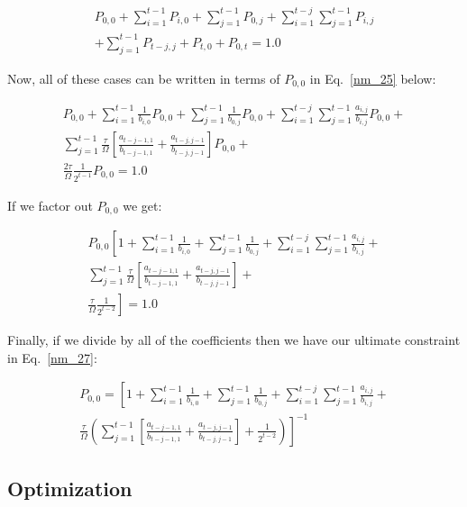 \documentclass[conference]{IEEEtran}
\begin{document}
\begin{multline}
  P_{0,0} +  \sum_{i = 1}^{t-1}{P_{i,0}} + \sum_{j = 1}^{t-1}{P_{0,j}} + \sum_{i=1}^{t-j}{\sum_{j=1}^{t-1}{P_{i,j}}} \\
  + \sum_{j=1}^{t-1}{P_{t-j,j}} + P_{t, 0} + P_{0, t} = 1.0 \label{nm_24}
\end{multline}

Now, all of these cases can be written in terms of $P_{0,0}$ in Eq.~\ref{nm_25} below:

\begin{multline}
  P_{0,0} +  \sum_{i = 1}^{t-1}{\frac{1}{b_{i,0}}P_{0,0}} + \sum_{j = 1}^{t-1}{\frac{1}{b_{0,j}}P_{0,0}} + 
  \sum_{i=1}^{t-j}{\sum_{j=1}^{t-1}{\frac{a_{i,j}}{b_{i,j}}P_{0,0}}} + \\
  \sum_{j=1}^{t-1}{\frac{\tau}{\Omega}\left[\frac{a_{t-j-1,1}}{b_{t-j-1,1}} + \frac{a_{t-j,j-1}}{b_{t-j,j-1}}\right]P_{0,0}} + \\
  \frac{2\tau}{\Omega}\frac{1}{2^{t-1}}P_{0,0} = 1.0 \label{nm_25}
\end{multline}

If we factor out $P_{0,0}$ we get:

\begin{multline}
  P_{0,0} \left[1 +  \sum_{i = 1}^{t-1}{\frac{1}{b_{i,0}}} + \sum_{j = 1}^{t-1}{\frac{1}{b_{0,j}}} + \right.
  \left.\sum_{i=1}^{t-j}{\sum_{j=1}^{t-1}{\frac{a_{i,j}}{b_{i,j}}}} + \right.\\
  \left.\sum_{j=1}^{t-1}{\frac{\tau}{\Omega}\left[\frac{a_{t-j-1,1}}{b_{t-j-1,1}} + \frac{a_{t-j,j-1}}{b_{t-j,j-1}}\right]} + \right.\\
  \left.\frac{\tau}{\Omega}\frac{1}{2^{t-2}}\right] = 1.0 \label{nm_26}
\end{multline}

Finally, if we divide by all of the coefficients then we have our ultimate constraint in Eq.~\ref{nm_27}:

\begin{multline}
  P_{0,0} = \left[1 +  \sum_{i = 1}^{t-1}{\frac{1}{b_{i,0}}} + \sum_{j = 1}^{t-1}{\frac{1}{b_{0,j}}} + 
  \sum_{i=1}^{t-j}{\sum_{j=1}^{t-1}{\frac{a_{i,j}}{b_{i,j}}}} + \right.\\
  \left.\frac{\tau}{\Omega}\left(\sum_{j=1}^{t-1}{\left[\frac{a_{t-j-1,1}}{b_{t-j-1,1}} + \frac{a_{t-j,j-1}}{b_{t-j,j-1}}\right]} + 
  \frac{1}{2^{t-2}}\right)\right]^{-1} \label{nm_27}
\end{multline}

\iffalse
\subsection{Optimization}\label{optimization}  
\end{document}
